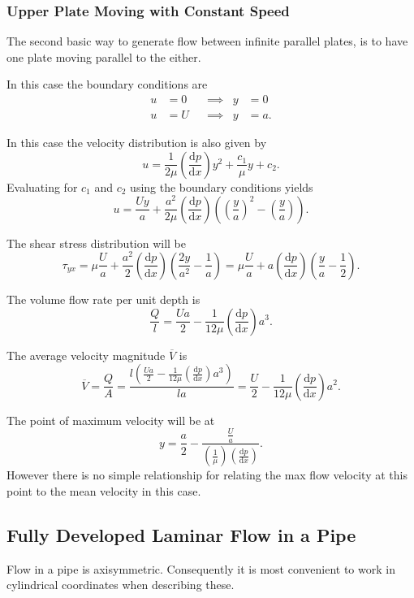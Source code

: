 \subsubsection{Upper Plate Moving with Constant Speed}
The second basic way to generate flow between infinite parallel plates, is to have one plate moving parallel to the either.

In this case the boundary conditions are
\begin{align*}
  u &= 0 & &\implies & y &= 0 \\
  u &= U & &\implies & y &=a
.\end{align*}

In this case the velocity distribution is also given by
\[ 
u = \frac{1}{2\mu} \left( \frac{\mathrm{d}p}{\mathrm{d}x}  \right)y^2 + \frac{c_1}{\mu}y + c_2
.\]
Evaluating for $c_1$ and $c_2$ using the boundary conditions yields
\[ 
u = \frac{Uy}{a} + \frac{a^2}{2\mu} \left( \frac{\mathrm{d}p}{\mathrm{d}x}  \right) \left(  \left( \frac{y}{a} \right)^2 - \left( \frac{y}{a} \right) \right)
.\]

The shear stress distribution will be
\[ 
\tau_{yx} = \mu \frac{U}{a} + \frac{a^2}{2} \left( \frac{\mathrm{d}p}{\mathrm{d}x}  \right) \left( \frac{2y}{a^2} - \frac{1}{a} \right) = \mu \frac{U}{a} + a \left( \frac{\mathrm{d}p}{\mathrm{d}x}  \right) \left( \frac{y}{a} - \frac{1}{2} \right)
.\]

The volume flow rate per unit depth is
\[ 
\frac{Q}{l} = \frac{Ua}{2} - \frac{1}{12\mu} \left( \frac{\mathrm{d}p}{\mathrm{d}x}  \right) a^3
.\]

The average velocity magnitude $\overline{V}$ is
\[ 
\overline{V} = \frac{Q}{A} = \frac{l \left( \frac{Ua}{2} - \frac{1}{12\mu} \left( \frac{\mathrm{d}p}{\mathrm{d}x}  \right) a^3 \right)}{la} = \frac{U}{2} - \frac{1}{12\mu} \left( \frac{\mathrm{d}p}{\mathrm{d}x}  \right) a^2
.\]

The point of maximum velocity will be at
\[ 
y = \frac{a}{2} - \frac{\frac{U}{a}}{\left( \frac{1}{\mu} \right) \left( \frac{\mathrm{d}p}{\mathrm{d}x}  \right)}
.\]
However there is no simple relationship for relating the max flow velocity at this point to the mean velocity in this case.


\subsection{Fully Developed Laminar Flow in a Pipe}
Flow in a pipe is axisymmetric.
Consequently it is most convenient to work in cylindrical coordinates when describing these.

